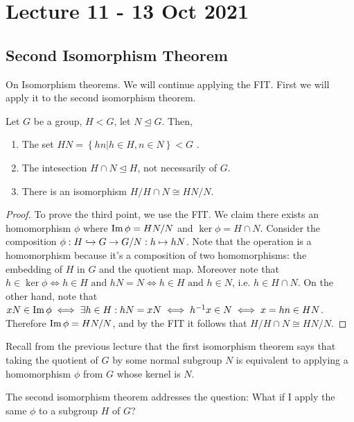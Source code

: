 \section{Lecture 11 - 13 Oct 2021}
\subsection{Second Isomorphism Theorem}
On Isomorphism theorems. We will continue applying the FIT. First we will apply it to the
second isomorphism theorem.
\begin{theorem}
  Let $G$ be a group, $H<G$, let $N\trianglelefteq G$. Then,
  \begin{enumerate}
    \item The set $HN=\left\{ hn |h\in H,n\in N \right\} <G$ .
    \item The intesection $H\cap N \trianglelefteq H$, not necessarily of $G$.
    \item There is an isomorphism $H/H\cap N \cong HN/N$.
  \end{enumerate}
  \label{secondIso}
\end{theorem}
\begin{proof}
  To prove the third point, we use the FIT. We claim there exists an homomorphism $\phi$
  where $\operatorname{Im}\phi= HN/N$ and $\ker\phi = H\cap N$. Consider the composition $\phi:H\xhookrightarrow{}
  G\to G/N: h\mapsto hN$. Note that the operation is a homomorphism because it's a
  composition of two homomorphisms: the embedding of $H$ in $G$ and the quotient map.
  Moreover note that $h\in\ker\phi \iff h\in H \text{ and } hN=N \iff h\in H \text{ and } h\in N$, i.e.
  $h\in H\cap N$. On the other hand, note that $xN\in\operatorname{Im}\phi \iff \exists h\in H : hN=xN
  \iff  h^{-1}x\in N \iff x = hn \in HN$.
  Therefore $\operatorname{Im}\phi = HN/N$, and by the FIT it follows
  that $H/H\cap N \cong HN/N$. 
\end{proof}
Recall from the previous lecture that the first isomorphism theorem says that taking the
quotient of $G$ by some normal subgroup $N$ is equivalent to applying a homomorphism $\phi$
from $G$ whose kernel is $N$.

The second isomorphism theorem addresses the question: What if I apply the same $\phi$ to
a subgroup $H$ of $G$? 

